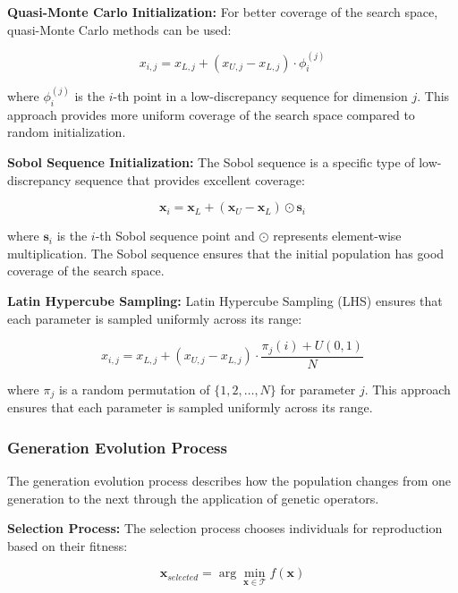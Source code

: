\documentclass[12pt,a4paper]{article}
\begin{document}
\textbf{Quasi-Monte Carlo Initialization:} For better coverage of the search space, quasi-Monte Carlo methods can be used:

\begin{equation}\label{Eq.qmc_initialization}
x_{i,j} = x_{L,j} + (x_{U,j} - x_{L,j}) \cdot \phi_i^{(j)}
\end{equation}

where $\phi_i^{(j)}$ is the $i$-th point in a low-discrepancy sequence for dimension $j$. This approach provides more uniform coverage of the search space compared to random initialization.

\textbf{Sobol Sequence Initialization:} The Sobol sequence is a specific type of low-discrepancy sequence that provides excellent coverage:

\begin{equation}\label{Eq.sobol_initialization}
\mathbf{x}_i = \mathbf{x}_L + (\mathbf{x}_U - \mathbf{x}_L) \odot \mathbf{s}_i
\end{equation}

where $\mathbf{s}_i$ is the $i$-th Sobol sequence point and $\odot$ represents element-wise multiplication. The Sobol sequence ensures that the initial population has good coverage of the search space.

\textbf{Latin Hypercube Sampling:} Latin Hypercube Sampling (LHS) ensures that each parameter is sampled uniformly across its range:

\begin{equation}\label{Eq.lhs_initialization}
x_{i,j} = x_{L,j} + (x_{U,j} - x_{L,j}) \cdot \frac{\pi_j(i) + U(0,1)}{N}
\end{equation}

where $\pi_j$ is a random permutation of $\{1, 2, \ldots, N\}$ for parameter $j$. This approach ensures that each parameter is sampled uniformly across its range.

\subsubsection{Generation Evolution Process}

The generation evolution process describes how the population changes from one generation to the next through the application of genetic operators.

\textbf{Selection Process:} The selection process chooses individuals for reproduction based on their fitness:

\begin{equation}\label{Eq.selection_process}
\mathbf{x}_{selected} = \arg\min_{\mathbf{x} \in \mathcal{T}} f(\mathbf{x})
\end{equation}
\end{document}
